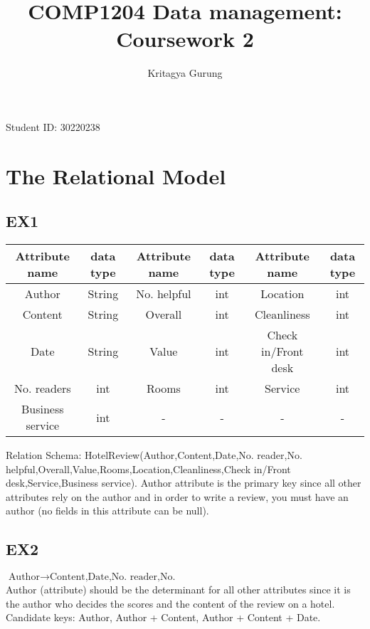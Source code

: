 \documentclass{article}
\title{COMP1204 Data management: Coursework 2}
\author{Kritagya Gurung}
\begin{document}
	
	\maketitle
	\begin{center}
		Student ID: 30220238
	\end{center}
	
	\newpage

	\section{The Relational Model}

	\subsection{EX1}
	
	\begin{center}
		\begin{tabular}{||c c | c c | c c ||} 
			\hline
			Attribute name & data type & Attribute name & data type & Attribute name & data type \\
			\hline
			Author & String & No. helpful & int & Location & int \\ 
			Content & String & Overall & int & Cleanliness & int \\ 
			Date & String & Value & int & Check in/Front desk & int \\ 
			No. readers & int & Rooms & int & Service & int \\
			Business service & int & - & - & - & -\\
			\hline
		
		\end{tabular}
	\end{center}
	Relation Schema: 
	\newline
	HotelReview(Author,Content,Date,No. reader,No. helpful,Overall,Value,Rooms,Location,Cleanliness,Check in/Front desk,Service,Business service).
	\newline
	Author attribute is the primary key since all other attributes rely on the author and in order to write a review, you must have an author (no fields in this attribute can be null).
	
	\subsection{EX2}
	\begin{math}
		\textrm{Author}
		\rightarrow
		\textrm{Content,Date,No. reader,No. helpful,Overall,Value,Rooms,Location,Cleanliness,Check in/Front desk,Service, Business service}
	\end{math}
	\newline
	Author (attribute) should be the determinant for all other attributes since it is the author who decides the scores and the content of the review on a hotel.
	\newline
	Candidate keys:
	\newline
	Author, Author + Content, Author + Content + Date. 
\end{document}
